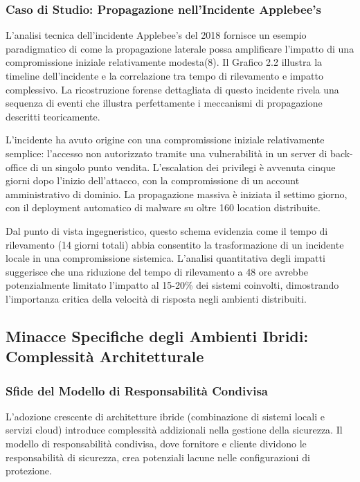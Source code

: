 \documentclass[12pt,a4paper,oneside]{book}
\begin{document}
\subsubsection{Caso di Studio: Propagazione nell'Incidente Applebee's}

L'analisi tecnica dell'incidente Applebee's del 2018 fornisce un esempio paradigmatico di come la propagazione laterale possa amplificare l'impatto di una compromissione iniziale relativamente modesta(8). Il Grafico 2.2 illustra la timeline dell'incidente e la correlazione tra tempo di rilevamento e impatto complessivo. La ricostruzione forense dettagliata di questo incidente rivela una sequenza di eventi che illustra perfettamente i meccanismi di propagazione descritti teoricamente.

L'incidente ha avuto origine con una compromissione iniziale relativamente semplice: l'accesso non autorizzato tramite una vulnerabilità in un server di back-office di un singolo punto vendita. L'escalation dei privilegi è avvenuta cinque giorni dopo l'inizio dell'attacco, con la compromissione di un account amministrativo di dominio. La propagazione massiva è iniziata il settimo giorno, con il deployment automatico di malware su oltre 160 location distribuite.

Dal punto di vista ingegneristico, questo schema evidenzia come il tempo di rilevamento (14 giorni totali) abbia consentito la trasformazione di un incidente locale in una compromissione sistemica. L'analisi quantitativa degli impatti suggerisce che una riduzione del tempo di rilevamento a 48 ore avrebbe potenzialmente limitato l'impatto al 15-20\% dei sistemi coinvolti, dimostrando l'importanza critica della velocità di risposta negli ambienti distribuiti.

\subsection{Minacce Specifiche degli Ambienti Ibridi: Complessità Architetturale}

\subsubsection{Sfide del Modello di Responsabilità Condivisa}

L'adozione crescente di architetture ibride (combinazione di sistemi locali e servizi cloud) introduce complessità addizionali nella gestione della sicurezza. Il modello di responsabilità condivisa, dove fornitore e cliente dividono le responsabilità di sicurezza, crea potenziali lacune nelle configurazioni di protezione.
\end{document}
